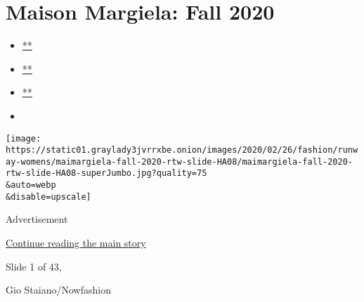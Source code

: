 \hypertarget{maison-margiela-fall-2020}{%
\section{Maison Margiela: Fall 2020}\label{maison-margiela-fall-2020}}

\begin{itemize}
\item
  \href{https://www.facebookcorewwwi.onion/sharer.php?app_id=9869919170\&u=https\%3A\%2F\%2Fwww.nytimes3xbfgragh.onion\%2Fslideshow\%2F2020\%2F02\%2F26\%2Ffashion\%2Frunway-womens\%2Fmaison-margiela-fall-2020.html\%3Fsmid\%3Dfb-share\&name=Maison\%20Margiela\%3A\%20Fall\%202020\&redirect_uri=https\%3A\%2F\%2Fwww.facebookcorewwwi.onion\%2F}{**}
\item
  \href{https://twitter.com/intent/tweet?url=https\%3A\%2F\%2Fwww.nytimes3xbfgragh.onion\%2Fslideshow\%2F2020\%2F02\%2F26\%2Ffashion\%2Frunway-womens\%2Fmaison-margiela-fall-2020.html\%3Fsmid\%3Dtw-share\&text=Maison\%20Margiela\%3A\%20Fall\%202020}{**}
\item
  \href{mailto:?subject=nytimes3xbfgragh.onion\%3A\%20Maison\%20Margiela\%3A\%20Fall\%202020\&body=From\%20The\%20New\%20York\%20Times\%3A\%0A\%0AMaison\%20Margiela\%3A\%20Fall\%202020\%0A\%0ASee\%20the\%20looks\%20from\%20the\%20Maison\%20Margiela\%3A\%20Fall\%202020\%20Collection.\%0A\%0Ahttps\%3A\%2F\%2Fwww.nytimes3xbfgragh.onion\%2Fslideshow\%2F2020\%2F02\%2F26\%2Ffashion\%2Frunway-womens\%2Fmaison-margiela-fall-2020.html\%3Fsmid\%3Dem-share}{**}
\item
\end{itemize}

\texttt{[image: https://static01.graylady3jvrrxbe.onion/images/2020/02/26/fashion/runway-womens/maimargiela-fall-2020-rtw-slide-HA08/maimargiela-fall-2020-rtw-slide-HA08-superJumbo.jpg?quality=75\\\&auto=webp\\\&disable=upscale]}

Advertisement

\protect\hyperlink{after-right-0}{Continue reading the main story}

Slide 1 of 43,

Gio Staiano/Nowfashion

